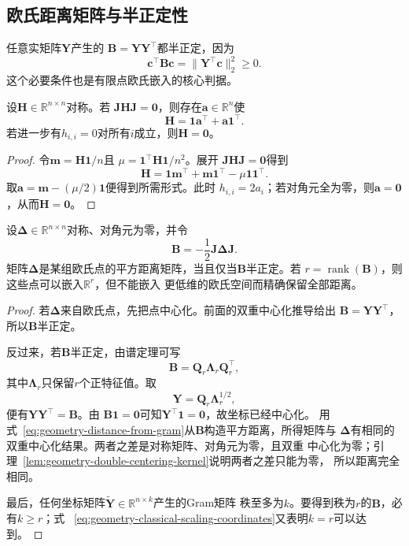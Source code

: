 \subsection{欧氏距离矩阵与半正定性}

任意实矩阵$\bm{Y}$产生的
$\bm{B}=\bm{Y}\bm{Y}^{\top}$都半正定，因为
\[
  \bm{c}^{\top}\bm{B}\bm{c}
  =
  \lVert\bm{Y}^{\top}\bm{c}\rVert_2^2
  \geq0.
\]
这个必要条件也是有限点欧氏嵌入的核心判据。

\begin{lemma}[双重中心化核的形式]
\label{lem:geometry-double-centering-kernel}
设$\bm{H}\in\mathbb{R}^{n\times n}$对称。若
$\bm{J}\bm{H}\bm{J}=\bm{0}$，则存在$\bm{a}\in\mathbb{R}^n$使
\[
  \bm{H}
  =
  \bm{1}\bm{a}^{\top}
  +
  \bm{a}\bm{1}^{\top}.
\]
若进一步有$h_{i,i}=0$对所有$i$成立，则$\bm{H}=\bm{0}$。
\end{lemma}

\begin{proof}
令$\bm{m}=\bm{H}\bm{1}/n$且
$\mu=\bm{1}^{\top}\bm{H}\bm{1}/n^2$。展开
$\bm{J}\bm{H}\bm{J}=\bm{0}$得到
\[
  \bm{H}
  =
  \bm{1}\bm{m}^{\top}
  +
  \bm{m}\bm{1}^{\top}
  -
  \mu\bm{1}\bm{1}^{\top}.
\]
取$\bm{a}=\bm{m}-(\mu/2)\bm{1}$便得到所需形式。此时
$h_{i,i}=2a_i$；若对角元全为零，则$\bm{a}=\bm{0}$，从而$\bm{H}=\bm{0}$。
\end{proof}

\begin{theorem}[有限距离的欧氏坐标重构]
\label{thm:geometry-euclidean-distance-embedding}
设$\bm{\Delta}\in\mathbb{R}^{n\times n}$对称、对角元为零，并令
\[
  \bm{B}
  =
  -\frac{1}{2}\bm{J}\bm{\Delta}\bm{J}.
\]
矩阵$\bm{\Delta}$是某组欧氏点的平方距离矩阵，当且仅当$\bm{B}$半正定。若
$r=\operatorname{rank}(\bm{B})$，则这些点可以嵌入$\mathbb{R}^r$，但不能嵌入
更低维的欧氏空间而精确保留全部距离。
\end{theorem}

\begin{proof}
若$\bm{\Delta}$来自欧氏点，先把点中心化。前面的双重中心化推导给出
$\bm{B}=\bm{Y}\bm{Y}^{\top}$，所以$\bm{B}$半正定。

反过来，若$\bm{B}$半正定，由谱定理可写
\[
  \bm{B}
  =
  \bm{Q}_r\bm{\Lambda}_r\bm{Q}_r^{\top},
\]
其中$\bm{\Lambda}_r$只保留$r$个正特征值。取
\begin{equation}
  \bm{Y}
  =
  \bm{Q}_r\bm{\Lambda}_r^{1/2},
  \label{eq:geometry-classical-scaling-coordinates}
\end{equation}
便有$\bm{Y}\bm{Y}^{\top}=\bm{B}$。由
$\bm{B}\bm{1}=\bm{0}$可知$\bm{Y}^{\top}\bm{1}=\bm{0}$，故坐标已经中心化。
用式~\eqref{eq:geometry-distance-from-gram}从$\bm{B}$构造平方距离，所得矩阵与
$\bm{\Delta}$有相同的双重中心化结果。两者之差是对称矩阵、对角元为零，且双重
中心化为零；引理~\ref{lem:geometry-double-centering-kernel}说明两者之差只能为零，
所以距离完全相同。

最后，任何坐标矩阵$\widetilde{\bm{Y}}\in\mathbb{R}^{n\times k}$产生的Gram矩阵
秩至多为$k$。要得到秩为$r$的$\bm{B}$，必有$k\geq r$；式
~\eqref{eq:geometry-classical-scaling-coordinates}又表明$k=r$可以达到。
\end{proof}

